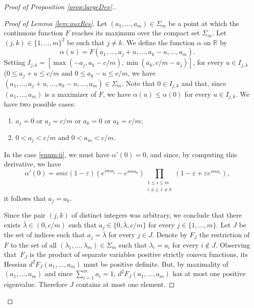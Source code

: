 \documentclass[JEP,XML,SOM,Unicode, NoEqCountersInSection,NoFloatCountersInSection,published]{cedram}
\newenvironment{enumeratei}
{\bgroup\def\theenumi{\roman{enumi}}\def\theenumii{\arabic{enumii}}\begin{enumerate}}
{\end{enumerate}\egroup}
\def\R{\mathbb{R}}
\theoremstyle{definition}
\begin{document}
\begin{proof}[Proof of Proposition \ref{prop:largeDev}.]
\begin{proof}[Proof of Lemma \ref{lem:auxRes}]
Let $(a_1,\dots, a_m)\in\Sigma_m$ be a point at which the continuous function $F$ reaches its maximum over the compact set $\Sigma_m$. Let $(j,k) \in \{1,\ldots,m\}^2$ be such that $j \neq k$. We define the function $\alpha$ on $\R$ by
\[
\alpha(u) = F(a_1, \ldots, a_j+u, \ldots, a_k - u, \ldots, a_m).
\]
Setting $I_{j,k}=[\max (-a_j,a_k-c/m),\min (a_k,c/m-a_j)]$, for every $u\in I_{j,k}$ (\ie $0 \leq a_j +u \leq c/m$ and $0 \leq a_k -u \leq c/m$, we have $(a_1, \ldots, a_j+u, \ldots, a_k - u, \ldots, a_m)\in\Sigma_m$. Note that $0\in I_{j,k}$ and that, since $(a_1, \ldots, a_m)$ is a maximizer of $F$, we have $\alpha(u)\leq \alpha(0)$ for every $u\in I_{j,k}$.
We have two possible cases:
\begin{enumeratei}
\item\label{enum:i}
$a_j=0$ or $a_j=c/m$ or $a_k=0$ or $a_k=c/m$;
\item\label{enum:ii}
$0<a_j<c/m$ and $0<a_m<c/m$.
\end{enumeratei}
In the case \eqref{enum:ii}, we must have $\alpha'(0)=0$, and since, by computing this derivative, we have
\[
\alpha'(0) =sm \varepsilon (1-\varepsilon) \left( e^{sm a_j} - e^{sm a_k } \right)\prod_{\substack{1 \leq i \leq m \\ i \neq j, \ i \not =k }}( 1-\varepsilon + \varepsilon e^{sma_{i}}),
\]
it follows that $a_j=a_k$.

Since the pair $(j,k)$ of distinct integers was arbitrary, we conclude that there exists $\bar \lambda\in (0,c/m)$ such that $a_j\in \{0,\bar\lambda, c/m\}$ for every $j\in \{1,\ldots,m\}$. Let $J$ be the set of indices such that $a_j=\bar \lambda$ for every $j\in J$. Denote by $F_J$ the restriction of $F$ to the set of all $(\lambda_1,\ldots,\lambda_m)\in\Sigma_m$ such that $\lambda_i=a_i$ for every $i\notin J$.
Observing that~$F_J$ is the product of separate variables positive strictly convex functions, its Hessian $d^2F_J(a_1,\dots,a_m)$ must be positive definite. But, by maximality of $(a_1,\dots,a_m)$ and since $\sum_{i=1}^ma_i=1$, $d^2F_J(a_1,\dots,a_m)$ has at most one positive eigenvalue. Therefore $J$ contains at most one element.


\end{proof}
\end{proof}
\end{document}
